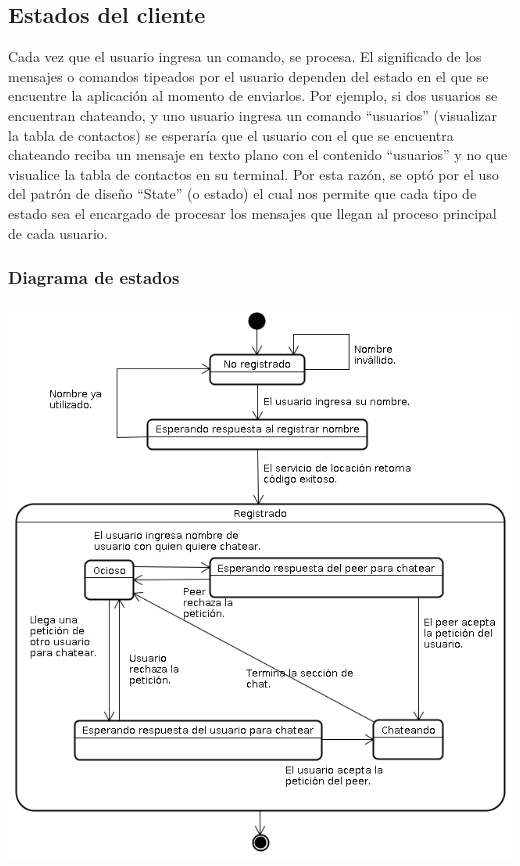 \subsection{Estados del cliente}

Cada vez que el usuario ingresa un comando, se procesa. El significado de los mensajes o comandos
tipeados por el usuario dependen del estado en el que se encuentre la aplicación al momento de 
enviarlos. Por ejemplo, si dos usuarios se encuentran chateando, y uno usuario ingresa un comando 
``usuarios'' (visualizar la tabla de contactos) se esperaría que el usuario con el que se encuentra
chateando reciba un mensaje en texto plano con el contenido ``usuarios'' y no que visualice la
tabla de contactos en su terminal. Por esta razón, se optó por el uso del patrón de diseño ``State'' 
(o estado) el cual nos permite que cada tipo de estado sea el encargado de procesar los mensajes que llegan 
al proceso principal de cada usuario. 

\subsubsection{Diagrama de estados}
\begin{center}
\small\includegraphics[scale=0.65]{./Images/DiagramaDeEstados}
\end{center}

